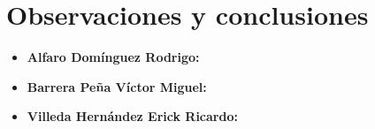 \section{Observaciones y conclusiones}

\begin{itemize}
	\item \textbf{Alfaro Domínguez Rodrigo:}
	\item \textbf{Barrera Peña Víctor Miguel:}
	\item \textbf{Villeda Hernández Erick Ricardo:}
\end{itemize}